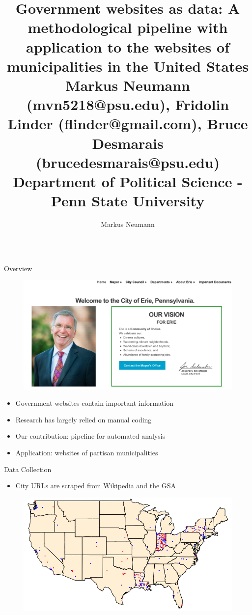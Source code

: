 \documentclass{beamer}
\author[mvn5218@psu.edu]{Markus Neumann}
\title{Government websites as data: A methodological pipeline with application to the websites of municipalities in the United States \\ \vspace{10mm} \small{Markus Neumann (mvn5218@psu.edu),  Fridolin Linder (flinder@gmail.com),  Bruce Desmarais (brucedesmarais@psu.edu) \\ Department of Political Science - Penn State University}}
\institute{The Pennsylvania State University}
\begin{document}
\beamertemplatenavigationsymbolsempty
\begin{frame}[fragile]
\begin{columns}[T]

\begin{column}{.4\textwidth}

\begin{block}{Overview}
\begin{figure}
    \centering
    \includegraphics[width=\linewidth]{eriemayor.png}
\end{figure}
\begin{itemize}
\item Government websites contain important information
\item Research has largely relied on manual coding
\item Our contribution: pipeline for automated analysis
\item Application: websites of partisan municipalities
\end{itemize}
\end{block}

\begin{block}{Data Collection}
\begin{itemize}
\item City URLs are scraped from Wikipedia and the GSA
\end{itemize}
\begin{figure}
    \centering
    \includegraphics[width=\linewidth]{us_map_resized.png}
\end{figure}
%
\end{block}


\end{column}
\end{columns}
\end{frame}
\end{document}
